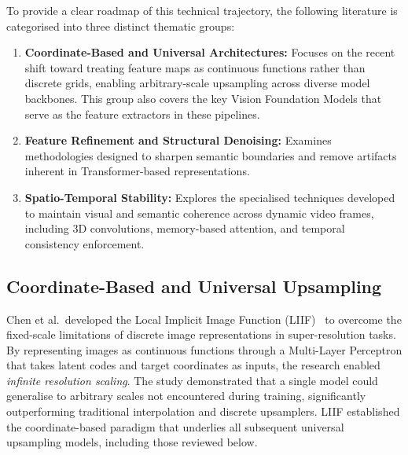 To provide a clear roadmap of this technical trajectory, the
following literature is categorised into three distinct
thematic groups:
\begin{enumerate}
  \item \textbf{Coordinate-Based and Universal Architectures:}
        Focuses on the recent shift toward treating feature maps
        as continuous functions rather than discrete grids,
        enabling arbitrary-scale upsampling across diverse model
        backbones. This group also covers the key Vision
        Foundation Models that serve as the feature extractors
        in these pipelines.

  \item \textbf{Feature Refinement and Structural Denoising:}
        Examines methodologies designed to sharpen semantic
        boundaries and remove artifacts inherent in
        Transformer-based representations.

  \item \textbf{Spatio-Temporal Stability:}
        Explores the specialised techniques developed to
        maintain visual and semantic coherence across dynamic
        video frames, including 3D convolutions, memory-based
        attention, and temporal consistency enforcement.
\end{enumerate}

\subsection{Coordinate-Based and Universal Upsampling}

Chen et al.\ developed the Local Implicit Image
Function (LIIF)~\cite{liif} to overcome the fixed-scale
limitations of discrete image representations in
super-resolution tasks.
By representing images as continuous functions through a
Multi-Layer Perceptron that takes latent codes and target
coordinates as inputs, the research enabled
\textit{infinite resolution scaling}.
The study demonstrated that a single model could generalise to
arbitrary scales not encountered during training, significantly
outperforming traditional interpolation and discrete
upsamplers.
LIIF established the coordinate-based paradigm that underlies
all subsequent universal upsampling models, including those
reviewed below.

